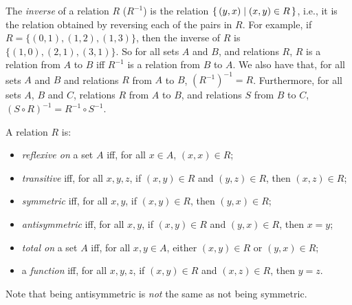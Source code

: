 The \emph{inverse}
%
of a relation $R$ ($R^{-1}$) is the relation
$\{ \, (y, x) \mid (x, y)\in R \, \}$, i.e., it is the relation obtained by
reversing each of the pairs in $R$.  For example, if
$R=\{(0, 1), (1, 2), (1, 3)\}$, then the inverse of $R$ is
$\{(1, 0), (2, 1), (3, 1)\}$.  So for all sets $A$ and $B$, and
relations $R$, $R$ is a relation from $A$ to $B$ iff $R^{-1}$ is a
relation from $B$ to $A$. We also have that, for all sets $A$ and $B$
and relations $R$ from $A$ to $B$, $(R^{-1})^{-1} = R$. Furthermore,
for all sets $A$, $B$ and $C$, relations $R$ from $A$ to $B$, and
relations $S$ from $B$ to $C$, $(S\circ R)^{-1} = R^{-1}\circ S^{-1}$.

A relation $R$ is:
\begin{itemize}
\item \emph{reflexive on}
%
%
a set $A$ iff, for all $x\in A$, $(x,x)\in R$;

\item \emph{transitive}
%
%
iff, for all $x,y,z$, if $(x,y)\in R$ and
$(y,z)\in R$, then $(x, z)\in R$;

\item \emph{symmetric}
%
%
iff, for all $x,y$, if $(x,y)\in R$, then $(y, x)\in R$;

\item \emph{antisymmetric}
%
%
iff, for all $x,y$, if $(x,y)\in R$ and $(y,x)\in R$, then $x=y$;

\item \emph{total on}
%
%
a set $A$ iff, for all $x,y\in A$, either $(x,y)\in R$ or $(y,x)\in R$;

\item a \emph{function}
%
%
iff, for all $x,y,z$, if $(x,y)\in R$ and $(x, z)\in R$, then $y=z$.
\end{itemize}
Note that being antisymmetric is \emph{not} the same as not being symmetric.

